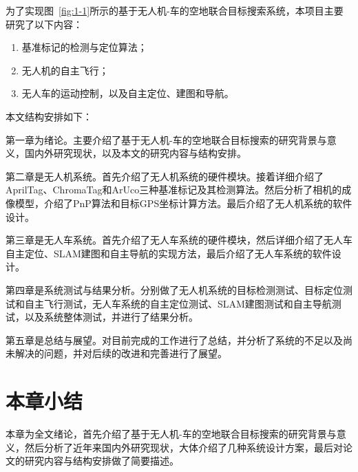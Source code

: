 为了实现图~\ref{fig:1-1}所示的基于无人机-车的空地联合目标搜索系统，本项目主要研究了以下内容：

\begin{enumerate}[label=(\arabic*)] 
	\item 基准标记的检测与定位算法；
	\item 无人机的自主飞行；
	\item 无人车的运动控制，以及自主定位、建图和导航。
\end{enumerate}

本文结构安排如下：

第一章为绪论。主要介绍了基于无人机-车的空地联合目标搜索的研究背景与意义，国内外研究现状，以及本文的研究内容与结构安排。

第二章是无人机系统。首先介绍了无人机系统的硬件模块。接着详细介绍了AprilTag、ChromaTag和ArUco三种基准标记及其检测算法。然后分析了相机的成像模型，介绍了PnP算法和目标GPS坐标计算方法。最后介绍了无人机系统的软件设计。

第三章是无人车系统。首先介绍了无人车系统的硬件模块，然后详细介绍了无人车自主定位、SLAM建图和自主导航的实现方法，最后介绍了无人车系统的软件设计。

第四章是系统测试与结果分析。分别做了无人机系统的目标检测测试、目标定位测试和自主飞行测试，无人车系统的自主定位测试、SLAM建图测试和自主导航测试，以及系统整体测试，并进行了结果分析。

第五章是总结与展望。对目前完成的工作进行了总结，并分析了系统的不足以及尚未解决的问题，并对后续的改进和完善进行了展望。

\section{本章小结}
本章为全文绪论，首先介绍了基于无人机-车的空地联合目标搜索的研究背景与意义，然后分析了近年来国内外研究现状，大体介绍了几种系统设计方案，最后对论文的研究内容与结构安排做了简要描述。

